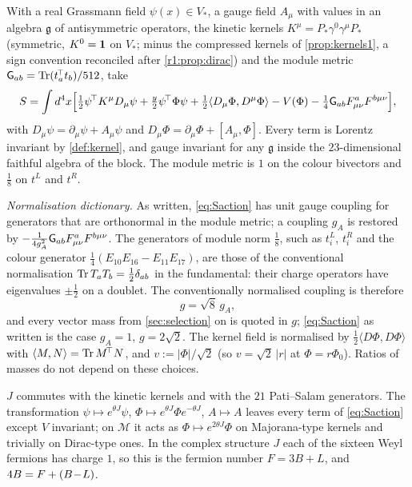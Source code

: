 With a real Grassmann field $\psi(x)\in V_*$, a gauge field $A_\mu$ with values in an algebra $\mathfrak g$ of antisymmetric operators, the kinetic
kernels $K^\mu=P_*\gamma^0\gamma^\mu P_*$ (symmetric, $K^0=\mathbf 1$ on $V_*$; minus the compressed kernels of \cref{prop:kernels1}, a sign
convention reconciled after \cref{r1:prop:dirac}) and the module metric $\mathsf G_{ab}=\operatorname{Tr}(t_a^{\!\top}t_b)/512$, take
\begin{equation}
\label{eq:Saction}
S=\int d^4x\Bigl[\tfrac12\psi^{\!\top}K^\mu D_\mu\psi+\tfrac y2\psi^{\!\top}\Phi\psi+\tfrac12\langle D_\mu\Phi,D^\mu\Phi\rangle-V(\Phi)-\tfrac14\mathsf G_{ab}F^a_{\mu\nu}F^{b\mu\nu}\Bigr],
\end{equation}
with $D_\mu\psi=\partial_\mu\psi+A_\mu\psi$ and $D_\mu\Phi=\partial_\mu\Phi+[A_\mu,\Phi]$. Every term is Lorentz invariant by \cref{def:kernel}, and gauge
invariant for any $\mathfrak g$ inside the $23$-dimensional faithful algebra of the block. The module metric is $1$ on the colour bivectors and
$\tfrac18$ on $t^L$ and $t^R$.

\emph{Normalisation dictionary.} As written, \eqref{eq:Saction} has unit gauge coupling for generators that are orthonormal in the module metric;
a coupling $g_A$ is restored by $-\tfrac1{4g_A^2}\mathsf G_{ab}F^a_{\mu\nu}F^{b\mu\nu}$. The generators of module norm $\tfrac18$, such as $t^L_i$, $t^R_i$ and the colour
generator $\tfrac14(E_{10}E_{16}-E_{11}E_{17})$, are those of the conventional normalisation $\operatorname{Tr} T_aT_b=\tfrac12\delta_{ab}$ in the fundamental: their charge
operators have eigenvalues $\pm\tfrac12$ on a doublet. The conventionally normalised coupling is therefore
\[
g=\sqrt8\,g_A ,
\]
and every vector mass from \cref{sec:selection} on is quoted in $g$; \eqref{eq:Saction} as written is the case $g_A=1$, $g=2\sqrt2$. The kernel field is normalised
by $\tfrac12\langle D\Phi,D\Phi\rangle$ with $\langle M,N\rangle=\operatorname{Tr} M^{\!\top}N$, and $v:=|\Phi|/\sqrt2$ (so $v=\sqrt2\,|r|$ at $\Phi=r\Phi_0$). Ratios of masses do not depend on these choices.

\begin{proposition}
\label{prop:fermionnumber}
$J$ commutes with the kinetic kernels and with the $21$ Pati--Salam generators. The transformation $\psi\mapsto e^{\theta J}\psi$,
$\Phi\mapsto e^{\theta J}\Phi e^{-\theta J}$, $A\mapsto A$ leaves every term of \eqref{eq:Saction} except $V$ invariant; on $\mathcal M$ it acts as
$\Phi\mapsto e^{2\theta J}\Phi$ on Majorana-type kernels and trivially on Dirac-type ones. In the complex structure $J$ each of the sixteen Weyl
fermions has charge $1$, so this is the fermion number $F=3B+L$, and $4B=F+(B\!-\!L)$.
\end{proposition}


